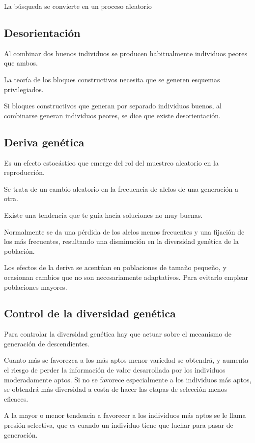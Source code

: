 \documentclass[12pt, twoside, openright]{report} %
\begin{document}
La búsqueda se convierte en un proceso aleatorio
\pagebreak

\subsection{Desorientación}
Al combinar dos buenos individuos se producen habitualmente individuos peores que ambos.

La teoría de los bloques constructivos necesita que se generen esquemas privilegiados.

Si bloques constructivos que generan por separado individuos buenos, al combinarse generan individuos peores, se dice que existe desorientación.

\subsection{Deriva genética}
Es un efecto estocástico que emerge del rol del muestreo aleatorio en la reproducción.

Se trata de un cambio aleatorio en la frecuencia de alelos de una generación a otra.

Existe una tendencia que te guía hacia soluciones no muy buenas.

Normalmente se da una pérdida de los alelos menos frecuentes y una fijación  de los más frecuentes, resultando una disminución en la diversidad genética de la población.

Los efectos de la deriva se acentúan en poblaciones de tamaño pequeño, y ocasionan cambios que no son necesariamente
adaptativos. Para evitarlo emplear poblaciones mayores.

\subsection{Control de la diversidad genética}
Para controlar la diversidad genética hay que actuar sobre el mecanismo de generación de descendientes.

Cuanto más se favorezca a los más aptos menor variedad se obtendrá, y aumenta el riesgo de perder la información de valor desarrollada por los individuos moderadamente aptos. Si no se favorece especialmente a los individuos más aptos, se obtendrá más diversidad a costa de hacer las etapas de selección menos eficaces.

A la mayor o menor tendencia a favorecer a los individuos más aptos se le llama presión selectiva, que es cuando un individuo tiene que luchar para pasar de generación.
\end{document}
